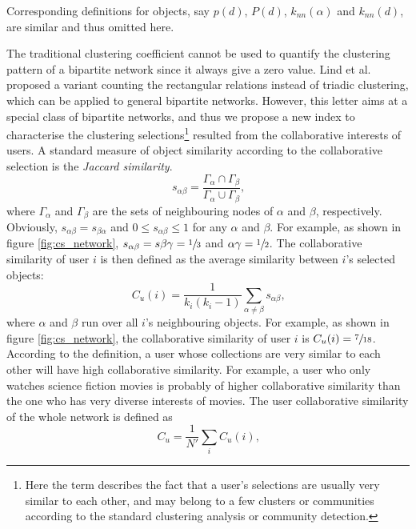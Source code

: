       Corresponding definitions for objects, say $p(d)$, $P(d)$, $k_{nn}(\alpha)$ and $k_{nn}(d)$, are similar and thus omitted here.
      
      The traditional clustering coefficient\cite{WattsStrogatz1998} cannot be used to quantify the clustering pattern of a bipartite network since it always give a zero value. Lind et al.\cite{LindGonzalezHerrmann2005} proposed a variant counting the rectangular relations instead of triadic clustering, which can be applied to general bipartite networks. However, this letter aims at a special class of bipartite networks, and thus we propose a new index to characterise the clustering selections\footnote{Here the term  describes the fact that a user's selections are usually very similar to each other, and may belong to a few clusters or communities according to the standard clustering analysis or community detection.} resulted from the collaborative interests of users. A standard measure of object similarity according to the collaborative selection is the \emph{Jaccard similarity}.\cite{Jaccard1901}
      \begin{equation}
        s_{\alpha\beta} = \frac{\Gamma_\alpha \cap \Gamma_\beta}{\Gamma_\alpha \cup \Gamma_\beta}\mbox{,}
      \end{equation}
      where $\Gamma_\alpha$ and $\Gamma_\beta$ are the sets of neighbouring nodes of $\alpha$ and $\beta$, respectively. Obviously, $s_{\alpha\beta} = s_{\beta\alpha}$ and $0 \leq s_{\alpha\beta} \leq 1$ for any $\alpha$ and $\beta$. For example, as shown in figure \ref{fig:cs_network}, $s_{\alpha\beta} = s{\beta\gamma} = \sfrac{1}{3}$ and ${\alpha\gamma} = \sfrac{1}{2}$. The collaborative similarity of user $i$ is then defined as the average similarity between $i$'s selected objects:
      \begin{equation}
        C_u(i) = \frac{1}{k_i(k_i-1)} \sum_{\alpha\neq\beta} s_{\alpha\beta}\mbox{,}
      \end{equation}
      where $\alpha$ and $\beta$ run over all $i$'s neighbouring objects. For example, as shown in figure \ref{fig:cs_network}, the collaborative similarity of user $i$ is $C_u(i) = \sfrac{7}{18}$. According to the definition, a user whose collections are very similar to each other will have high collaborative similarity. For example, a user who only watches science fiction movies is probably of higher collaborative similarity than the one who has very diverse interests of movies. The user collaborative similarity of the whole network is defined as
      \begin{equation}
        C_u = \frac{1}{N\prime} \sum_{i} C_u(i)\mbox{,}
      \end{equation}
